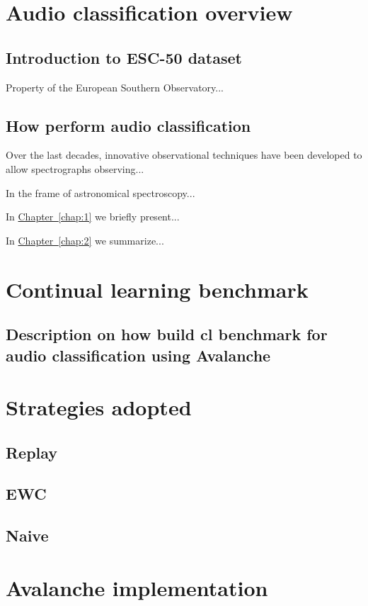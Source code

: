 \documentclass[english, LaM, oneside]{sapthesis}%
\begin{document}
\chapter{Audio classification overview}

\section{Introduction to ESC-50 dataset}
Property of the European Southern Observatory...

\section{How perform audio classification }
\label{sec:caso}
Over the last decades, innovative observational techniques have been developed to allow spectrographs observing...

\lettrine[lines=2, findent=3pt, nindent=0pt]{I}{}n the frame of astronomical spectroscopy...

\bigskip
In \hyperref[chap:1]{Chapter~\ref*{chap:1}} we  briefly present...

\bigskip
In \hyperref[chap:2]{Chapter~\ref*{chap:2}} we summarize...


\chapter{Continual learning benchmark}

\section{Description on how build cl benchmark for audio classification using Avalanche}

\chapter{Strategies adopted}
\section{Replay}
\section{EWC}
\section{Naive}


\chapter{Avalanche implementation}
\end{document}
